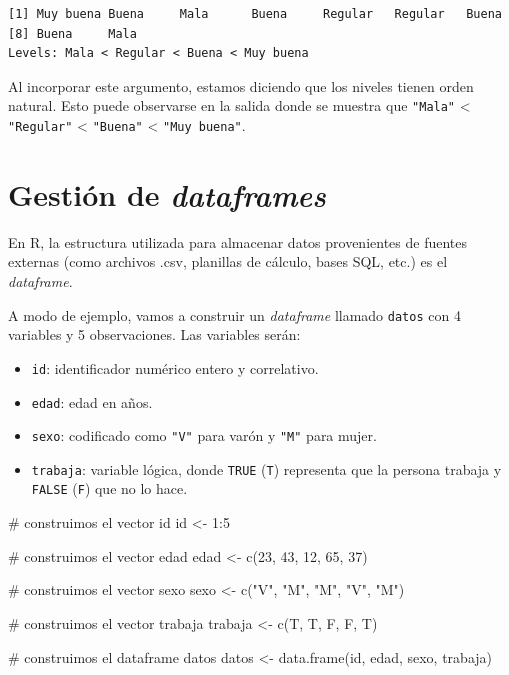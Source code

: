 \documentclass[
  spanish,
  a4paper,
]{scrbook}
\newenvironment{Shaded}{\begin{snugshade}}{\end{snugshade}}
\newcommand{\CommentTok}[1]{\textcolor[rgb]{0.37,0.37,0.37}{#1}}
\newcommand{\DecValTok}[1]{\textcolor[rgb]{0.68,0.00,0.00}{#1}}
\newcommand{\FunctionTok}[1]{\textcolor[rgb]{0.28,0.35,0.67}{#1}}
\newcommand{\NormalTok}[1]{\textcolor[rgb]{0.00,0.23,0.31}{#1}}
\newcommand{\OtherTok}[1]{\textcolor[rgb]{0.00,0.23,0.31}{#1}}
\newcommand{\SpecialCharTok}[1]{\textcolor[rgb]{0.37,0.37,0.37}{#1}}
\newcommand{\StringTok}[1]{\textcolor[rgb]{0.13,0.47,0.30}{#1}}
\begin{document}
\begin{verbatim}
[1] Muy buena Buena     Mala      Buena     Regular   Regular   Buena    
[8] Buena     Mala     
Levels: Mala < Regular < Buena < Muy buena
\end{verbatim}

Al incorporar este argumento, estamos diciendo que los niveles tienen
orden natural. Esto puede observarse en la salida donde se muestra que
\texttt{"Mala"} \textless{} \texttt{"Regular"} \textless{}
\texttt{"Buena"} \textless{} \texttt{"Muy\ buena"}.

\section{\texorpdfstring{Gestión de
\emph{dataframes}}{Gestión de dataframes}}\label{gestiuxf3n-de-dataframes}

En R, la estructura utilizada para almacenar datos provenientes de
fuentes externas (como archivos .csv, planillas de cálculo, bases SQL,
etc.) es el \emph{dataframe}.

A modo de ejemplo, vamos a construir un \emph{dataframe} llamado
\texttt{datos} con 4 variables y 5 observaciones. Las variables serán:

\begin{itemize}
\item
  \texttt{id}: identificador numérico entero y correlativo.
\item
  \texttt{edad}: edad en años.
\item
  \texttt{sexo}: codificado como \texttt{"V"} para varón y \texttt{"M"}
  para mujer.
\item
  \texttt{trabaja}: variable lógica, donde \texttt{TRUE} (\texttt{T})
  representa que la persona trabaja y \texttt{FALSE} (\texttt{F}) que no
  lo hace.
\end{itemize}

\begin{Shaded}
\begin{Highlighting}[]
\CommentTok{\# construimos el vector id}
\NormalTok{id }\OtherTok{\textless{}{-}} \DecValTok{1}\SpecialCharTok{:}\DecValTok{5}

\CommentTok{\# construimos el vector edad}
\NormalTok{edad }\OtherTok{\textless{}{-}} \FunctionTok{c}\NormalTok{(}\DecValTok{23}\NormalTok{, }\DecValTok{43}\NormalTok{, }\DecValTok{12}\NormalTok{, }\DecValTok{65}\NormalTok{, }\DecValTok{37}\NormalTok{)}

\CommentTok{\# construimos el vector sexo}
\NormalTok{sexo }\OtherTok{\textless{}{-}} \FunctionTok{c}\NormalTok{(}\StringTok{"V"}\NormalTok{, }\StringTok{"M"}\NormalTok{, }\StringTok{"M"}\NormalTok{, }\StringTok{"V"}\NormalTok{, }\StringTok{"M"}\NormalTok{)}

\CommentTok{\# construimos el vector trabaja}
\NormalTok{trabaja }\OtherTok{\textless{}{-}} \FunctionTok{c}\NormalTok{(T, T, F, F, T)}

\CommentTok{\# construimos el dataframe datos}
\NormalTok{datos }\OtherTok{\textless{}{-}} \FunctionTok{data.frame}\NormalTok{(id, edad, sexo, trabaja)}
\end{Highlighting}
\end{Shaded}
\end{document}
